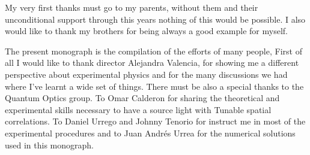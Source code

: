 \documentclass[
12pt, %
oneside, %
english, %
onehalfspacing, %
headsepline, %
]{Structural} %
\begin{document}

\begin{acknowledgements}
\addchaptertocentry{\acknowledgementname} %
My very first thanks must go to my parents, without them and their unconditional support through 
this years nothing of this would be possible. I also would like to thank my brothers for being always 
a good example for myself.

The present monograph is the compilation of the efforts of many people, First of all I would 
like to thank director Alejandra Valencia, for showing me a different perspective about 
experimental physics and for the many discussions we had where I’ve learnt a wide set of things. 
There must be also a special thanks to the Quantum Optics group. 
To Omar Calderon for sharing the theoretical and experimental skills necessary to have a 
source light with Tunable spatial correlations. To Daniel Urrego and Johnny Tenorio for instruct me in most 
of the experimental procedures and to Juan Andrés Urrea for the numerical 
solutions used in this monograph.

\end{acknowledgements}


\tableofcontents %

\listoffigures %




\end{document}
